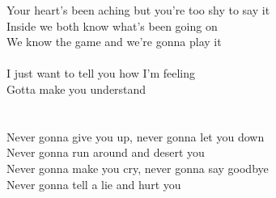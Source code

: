 Your heart's been aching but you're too shy to say it\\
Inside we both know what's been going on\\
We know the game and we're gonna play it\\
\\
I just want to tell you how I'm feeling\\
Gotta make you understand\\
\\
[Chorus]\\
Never gonna give you up, never gonna let you down\\
Never gonna run around and desert you\\
Never gonna make you cry, never gonna say goodbye\\
Never gonna tell a lie and hurt you
